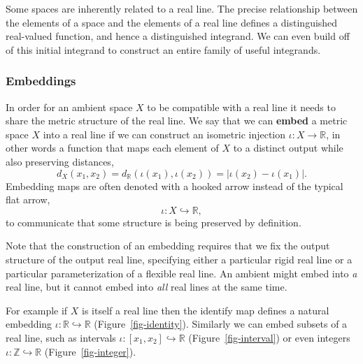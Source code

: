 \documentclass[
  letterpaper,
  DIV=11,
  numbers=noendperiod]{scrartcl}
\begin{document}
Some spaces are inherently related to a real line. The precise
relationship between the elements of a space and the elements of a real
line defines a distinguished real-valued function, and hence a
distinguished integrand. We can even build off of this initial integrand
to construct an entire family of useful integrands.

\hypertarget{embeddings}{%
\subsubsection{Embeddings}\label{embeddings}}

In order for an ambient space \(X\) to be compatible with a real line it
needs to share the metric structure of the real line. We say that we can
\textbf{embed} a metric space \(X\) into a real line if we can construct
an isometric injection \(\iota : X \rightarrow \mathbb{R}\), in other
words a function that maps each element of \(X\) to a distinct output
while also preserving distances, \[
d_{X}(x_{1}, x_{2})
= d_{\mathbb{R}}(\iota(x_{1}), \iota(x_{2}))
= | \iota(x_{2}) - \iota(x_{1}) |.
\] Embedding maps are often denoted with a hooked arrow instead of the
typical flat arrow, \[
\iota : X \hookrightarrow \mathbb{R},
\] to communicate that some structure is being preserved by definition.

Note that the construction of an embedding requires that we fix the
output structure of the output real line, specifying either a particular
rigid real line or a particular parameterization of a flexible real
line. An ambient might embed into \emph{a} real line, but it cannot
embed into \emph{all} real lines at the same time.

For example if \(X\) is itself a real line then the identify map defines
a natural embedding \(\iota : \mathbb{R} \hookrightarrow \mathbb{R}\)
(Figure~\ref{fig-identity}). Similarly we can embed subsets of a real
line, such as intervals
\(\iota : [x_{1}, x_{2}] \hookrightarrow \mathbb{R}\)
(Figure~\ref{fig-interval}) or even integers
\(\iota : \mathbb{Z} \hookrightarrow \mathbb{R}\)
(Figure~\ref{fig-integer}).
\end{document}
